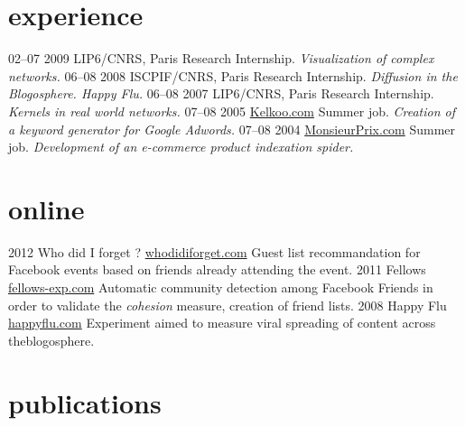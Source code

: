 \documentclass[]{friggeri-cv}
\begin{document}
\section{experience}

\begin{entrylist}
  \entry
    {02–07 2009}
    {LIP6/CNRS, Paris}
    {Research Internship.}
    {\emph{Visualization of complex networks.}}
  \entry
    {06–08 2008}
    {ISCPIF/CNRS, Paris}
    {Research Internship.}
    {\emph{Diffusion in the Blogosphere. Happy Flu.}}
  \entry
    {06–08 2007}
    {LIP6/CNRS, Paris}
    {Research Internship.}
    {\emph{Kernels in real world networks.}}
  \entry
    {07–08 2005}
    {\href{http://www.kelkoo.com}{Kelkoo.com}}
    {Summer job.}
    {\emph{Creation of a keyword generator for Google Adwords.}}
  \entry
    {07–08 2004}
    {\href{http://www.monsieurprix.com}{MonsieurPrix.com}}
    {Summer job.}
    {\emph{Development of an e-commerce product indexation spider.}}
\end{entrylist}

\section{online}

\begin{entrylist}
  \entry
    {2012}
    {Who did I forget ?}
    {\href{http://whodidiforget.com}{whodidiforget.com}}
    {Guest list recommandation for Facebook events based on friends already attending the event.}
  \entry
    {2011}
    {Fellows}
    {\href{http://fellows-exp.com}{fellows-exp.com}}
    {Automatic community detection among Facebook Friends in order to validate the \emph{cohesion} measure, creation of friend lists.}
  \entry
    {2008}
    {Happy Flu}
    {\href{http://happyflu.com}{happyflu.com}}
    {Experiment aimed to measure viral spreading of content across theblogosphere.}
\end{entrylist}

\section{publications}

\end{document}
